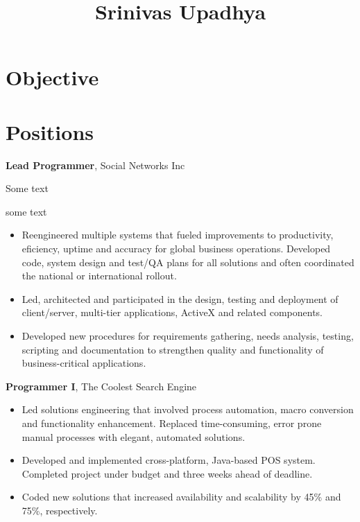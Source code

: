 \documentclass[11pt]{article}
\title{\bfseries\Huge Srinivas Upadhya}
\author{}
\date{}
\begin{document}
\maketitle
\section*{Objective}
\begin{leftrulebox}[Objective]
	\kant[1]
\end{leftrulebox}


\section*{Positions}
\begin{leftrulebox}[1/2010 -- 2/2012]
	\textbf{Lead Programmer}, Social Networks Inc \par
	Some text \par some text\par
	\begin{itemize}%
		\item Reengineered multiple systems that fueled improvements to productivity, eficiency, uptime and
                accuracy for global business operations. Developed code, system design and test/QA plans for
                all solutions and often coordinated the national or international rollout.
		\item Led, architected and participated in the design, testing and deployment of client/server,
                multi-tier applications, ActiveX and related components.
		\item Developed new procedures for requirements gathering, needs analysis, testing, scripting and
                documentation to strengthen quality and functionality of business-critical applications.
	\end{itemize}
\end{leftrulebox}
%
\begin{leftrulebox}[1/2009 -- 2/2010]
	\textbf{Programmer I}, The Coolest Search Engine \par
	\begin{itemize}%
		\item Led solutions engineering that involved process automation, macro conversion and functionality
                enhancement. Replaced time-consuming, error prone manual processes with elegant, automated
                solutions.
		\item Developed and implemented cross-platform, Java-based POS system. Completed project under budget
                and three weeks ahead of deadline.
		\item Coded new solutions that increased availability and scalability by 45\% and 75\%, respectively.
	\end{itemize}
\end{leftrulebox}
\end{document}
